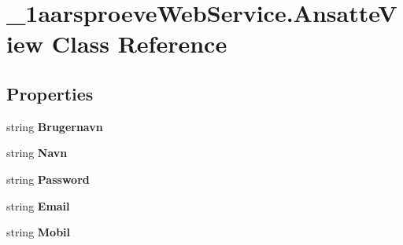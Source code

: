 \hypertarget{class__1aarsproeve_web_service_1_1_ansatte_view}{}\section{\+\_\+1aarsproeve\+Web\+Service.\+Ansatte\+View Class Reference}
\label{class__1aarsproeve_web_service_1_1_ansatte_view}
\subsection*{Properties}
\begin{DoxyCompactItemize}
\item 
\hypertarget{class__1aarsproeve_web_service_1_1_ansatte_view_a26c5ca4df2d1636e6f4d0a2f187d1606}{}string {\bfseries Brugernavn}\label{class__1aarsproeve_web_service_1_1_ansatte_view_a26c5ca4df2d1636e6f4d0a2f187d1606}

\item 
\hypertarget{class__1aarsproeve_web_service_1_1_ansatte_view_a29779b6ab76e66ee6557b7d494898747}{}string {\bfseries Navn}\label{class__1aarsproeve_web_service_1_1_ansatte_view_a29779b6ab76e66ee6557b7d494898747}

\item 
\hypertarget{class__1aarsproeve_web_service_1_1_ansatte_view_a7ee2ee14a91aaf9fba5da5fc5a1064af}{}string {\bfseries Password}\label{class__1aarsproeve_web_service_1_1_ansatte_view_a7ee2ee14a91aaf9fba5da5fc5a1064af}

\item 
\hypertarget{class__1aarsproeve_web_service_1_1_ansatte_view_a30ebd80cb0f5eeac8bb3ad05a5ab38be}{}string {\bfseries Email}\label{class__1aarsproeve_web_service_1_1_ansatte_view_a30ebd80cb0f5eeac8bb3ad05a5ab38be}

\item 
\hypertarget{class__1aarsproeve_web_service_1_1_ansatte_view_ae5d56dc63321921afccc34a9a991db13}{}string {\bfseries Mobil}\label{class__1aarsproeve_web_service_1_1_ansatte_view_ae5d56dc63321921afccc34a9a991db13}


\end{DoxyCompactItemize}
